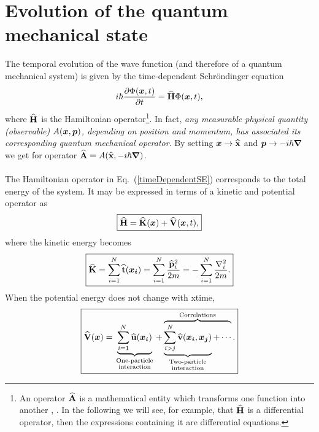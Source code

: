 \section{Evolution of the quantum mechanical state}

The temporal evolution of the wave function (and therefore of a quantum mechanical system) is given by the time-dependent Schr\"ondinger equation
\begin{equation}\label{timeDependentSE}
i \hbar \frac{\partial \Phi(\boldsymbol{x}, t)}{\partial t} = {\bf\widehat{H}}\Phi(\boldsymbol{x}, t),
\end{equation}
where ${\bf\widehat{H}}$ is the Hamiltonian operator\footnote{An operator ${\bf\widehat{A}}$ is a mathematical entity which transforms one function into another \cite{Bowman}, . In the following we will see, for example, that ${\bf\widehat{H}}$ is a differential operator, then the expressions containing it are differential equations.}. In fact, \emph{any measurable physical quantity (observable) $A(\boldsymbol{x}, \boldsymbol{p})$, depending on position and momentum, has associated its corresponding quantum mechanical operator}. By setting $\boldsymbol{x} \rightarrow {\bf\widehat{x}}$ and $\boldsymbol{p} \rightarrow - i \hbar \boldsymbol{\nabla}$ we get for operator ${\bf\widehat{A}} = A({\bf\widehat{x}}, - i \hbar \boldsymbol{\nabla})$.\\
\\
The Hamiltonian operator in  Eq.~(\ref{timeDependentSE}) corresponds to the total energy of the system. It may be expressed in terms of a kinetic and potential operator as
\begin{equation}\label{generalHamiltonian}
\boxed{{\bf\widehat{H}} = {\bf\widehat{K}}(\boldsymbol{x}) + {\bf\widehat{V}}(\boldsymbol{x},t),}
\end{equation}
where the kinetic energy becomes 
\begin{equation}\label{kineticEnergy}
\boxed{{\bf\widehat{K}} = \sum_{i=1}^{N} {\bf\widehat{t}} (\boldsymbol{x_i}) = \sum_{i=1}^{N} \frac{{\bf\widehat{p}}_{i}^{2}}{2m} = - \sum_{i=1}^{N}\frac{\nabla_{i}^{2}}{2m}.}
\end{equation}
When the potential energy does not change with xtime, 
\begin{equation}\label{timeIndependentPotential}
 \boxed{{\bf\widehat{V}}(\boldsymbol{x}) = \underbrace{\sum_{i=1}^{N} {\bf\widehat{u}}(\boldsymbol{x_i})}_{\begin{smallmatrix}
  \text{One-particle} \\
  \text{interaction}
\end{smallmatrix}} + \overbrace{\underbrace{\sum_{i>j}^{N} {\bf\widehat{v}}(\boldsymbol{x_i}, \boldsymbol{x_j})}_{\begin{smallmatrix}
  \text{Two-particle} \\
  \text{interaction}
\end{smallmatrix}} + \cdots}^{\begin{smallmatrix}
  \text{Correlations}
\end{smallmatrix}}.}
\end{equation}
